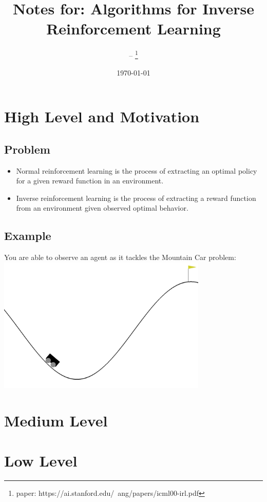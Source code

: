 \documentclass{article}
\title{Notes for: Algorithms for Inverse Reinforcement Learning}
\author{-- \thanks{paper: https://ai.stanford.edu/~ang/papers/icml00-irl.pdf}}
\date{\today}
\begin{document}
    \maketitle
    
    \section{High Level and Motivation}

    \subsection{Problem}
    
    \begin{itemize}
        \item Normal reinforcement learning is the process of extracting an optimal policy for a given reward function in an environment.
        \item Inverse reinforcement learning is the process of extracting a reward function from an environment given observed optimal behavior.
    \end{itemize}
    
    \subsection{Example}
    You are able to observe an agent as it tackles the Mountain Car problem:
    \includegraphics[width=10cm]{fig1.png}

    \section{Medium Level}

    \section{Low Level}
\end{document}
